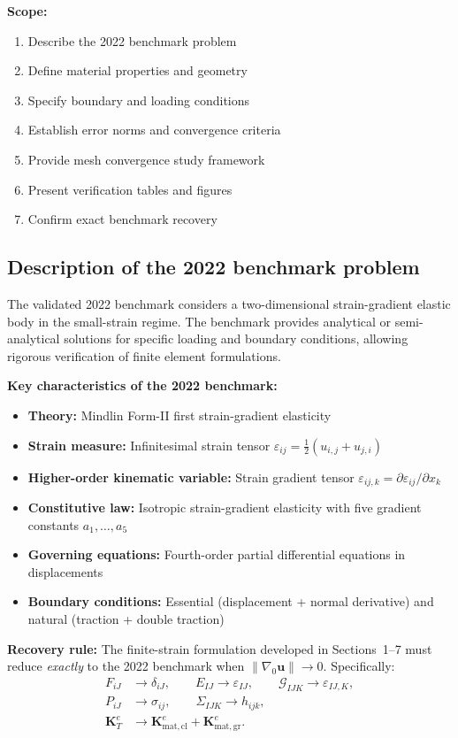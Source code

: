 \documentclass[11pt]{article}
\begin{document}
\textbf{Scope:}
\begin{enumerate}
\item Describe the 2022 benchmark problem
\item Define material properties and geometry
\item Specify boundary and loading conditions
\item Establish error norms and convergence criteria
\item Provide mesh convergence study framework
\item Present verification tables and figures
\item Confirm exact benchmark recovery
\end{enumerate}

\subsection{Description of the 2022 benchmark problem}
\label{ssec:benchmark}

The validated 2022 benchmark \cite{TorabiNiiranen2022} considers a
two-dimensional strain-gradient elastic body in the small-strain regime.
The benchmark provides analytical or semi-analytical solutions for
specific loading and boundary conditions, allowing rigorous verification
of finite element formulations.

\textbf{Key characteristics of the 2022 benchmark:}
\begin{itemize}
\item \textbf{Theory:} Mindlin Form-II first strain-gradient elasticity
  \cite{Mindlin1964,MindlinEshel1968}
\item \textbf{Strain measure:} Infinitesimal strain tensor
  $\varepsilon_{ij} = \tfrac12(u_{i,j}+u_{j,i})$
\item \textbf{Higher-order kinematic variable:} Strain gradient tensor
  $\varepsilon_{ij,k} = \partial\varepsilon_{ij}/\partial x_{k}$
\item \textbf{Constitutive law:} Isotropic strain-gradient elasticity
  with five gradient constants $a_{1},\ldots,a_{5}$
\item \textbf{Governing equations:} Fourth-order partial differential
  equations in displacements
\item \textbf{Boundary conditions:} Essential (displacement + normal
  derivative) and natural (traction + double traction)
\end{itemize}

\textbf{Recovery rule:} The finite-strain formulation developed in
Sections~1--7 must reduce \emph{exactly} to the 2022 benchmark when
$\|\nabla_{0}\mathbf{u}\|\to 0$. Specifically:
\begin{align}
F_{iJ} &\to \delta_{iJ},
\qquad
E_{IJ} \to \varepsilon_{IJ},
\qquad
\mathcal{G}_{IJK} \to \varepsilon_{IJ,K},
\label{s8:limits}
\\
P_{iJ} &\to \sigma_{ij},
\qquad
\Sigma_{IJK} \to h_{ijk},
\label{s8:stress_limits}
\\
\mathbf{K}_{T}^{e} &\to \mathbf{K}_{\mathrm{mat,cl}}^{e}
+ \mathbf{K}_{\mathrm{mat,gr}}^{e}.
\label{s8:tangent_limit}
\end{align}
\end{document}
